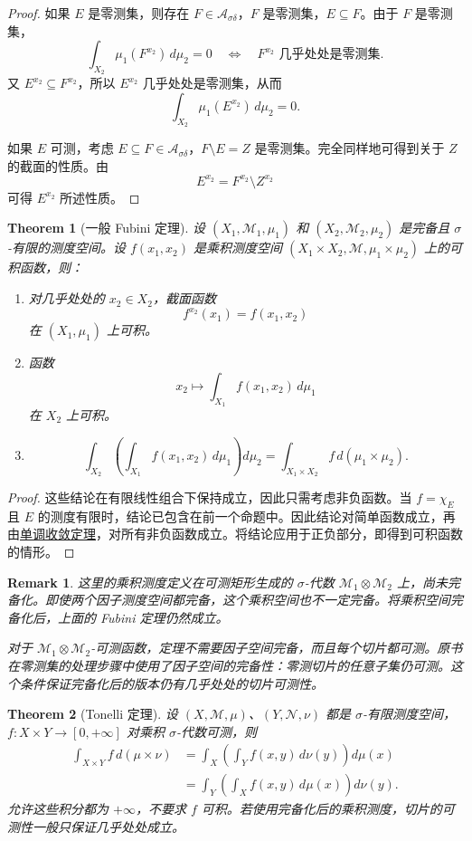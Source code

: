 \documentclass[12pt,letterpaper,twoside,openright]{ctexbook}
\theoremstyle{bluehead}
\newtheorem{theorem}{Theorem}
\theoremstyle{olivehead}
\theoremstyle{orangehead}
\theoremstyle{redremark}
\newtheorem*{remark}{Remark}
\begin{document}
\begin{proof}
如果 $E$ 是零测集，则存在 $F\in\mathcal{A}_{\sigma\delta}$，$F$ 是零测集，$E\subseteq F$。由于 $F$ 是零测集，
\[
  \int_{X_2}\mu_1(F^{x_2})\,d\mu_2=0
  \quad\Longleftrightarrow\quad
  F^{x_2}\text{ 几乎处处是零测集}.
\]
又 $E^{x_2}\subseteq F^{x_2}$，所以 $E^{x_2}$ 几乎处处是零测集，从而
\[
  \int_{X_2}\mu_1(E^{x_2})\,d\mu_2=0.
\]

如果 $E$ 可测，考虑 $E\subseteq F\in\mathcal{A}_{\sigma\delta}$，$F\setminus E=Z$ 是零测集。完全同样地可得到关于 $Z$ 的截面的性质。由
\[
  E^{x_2}=F^{x_2}\setminus Z^{x_2}
\]
可得 $E^{x_2}$ 所述性质。
\end{proof}
\begin{theorem}[一般 Fubini 定理]\label{thm:fubini-general}
设 $(X_1,\mathcal{M}_1,\mu_1)$ 和 $(X_2,\mathcal{M}_2,\mu_2)$ 是完备且 $\sigma$-有限的测度空间。设 $f(x_1,x_2)$ 是乘积测度空间 $(X_1\times X_2,\mathcal{M},\mu_1\times\mu_2)$ 上的可积函数，则：
\begin{enumerate}
  \item[(1)] 对几乎处处的 $x_2\in X_2$，截面函数
  \[
    f^{x_2}(x_1)=f(x_1,x_2)
  \]
  在 $(X_1,\mu_1)$ 上可积。
  \item[(2)] 函数
  \[
    x_2\longmapsto\int_{X_1}f(x_1,x_2)\,d\mu_1
  \]
  在 $X_2$ 上可积。
  \item[(3)]
  \[
    \int_{X_2}\left(\int_{X_1}f(x_1,x_2)\,d\mu_1\right)d\mu_2
    =\int_{X_1\times X_2}f\,d(\mu_1\times\mu_2).
  \]
\end{enumerate}
\end{theorem}
\begin{proof}
这些结论在有限线性组合下保持成立，因此只需考虑非负函数。当 $f=\chi_E$ 且 $E$ 的测度有限时，结论已包含在前一个命题中。因此结论对简单函数成立，再由\hyperref[thm:monotone-convergence]{单调收敛定理}，对所有非负函数成立。将结论应用于正负部分，即得到可积函数的情形。
\end{proof}
\begin{remark}
这里的乘积测度定义在可测矩形生成的 $\sigma$-代数 $\mathcal M_1\otimes\mathcal M_2$ 上，尚未完备化。即使两个因子测度空间都完备，这个乘积空间也不一定完备。将乘积空间完备化后，上面的 Fubini 定理仍然成立。

对于 $\mathcal M_1\otimes\mathcal M_2$-可测函数，定理不需要因子空间完备，而且每个切片都可测。原书在零测集的处理步骤中使用了因子空间的完备性：零测切片的任意子集仍可测。这个条件保证完备化后的版本仍有几乎处处的切片可测性。
\end{remark}
\begin{theorem}[Tonelli 定理]\label{thm:tonelli-general}
设 $(X,\mathcal M,\mu)$、$(Y,\mathcal N,\nu)$ 都是 $\sigma$-有限测度空间，$f:X\times Y\to[0,+\infty]$ 对乘积 $\sigma$-代数可测，则
\[
\begin{aligned}
\int_{X\times Y}f\,d(\mu\times\nu)
&=\int_X\left(\int_Yf(x,y)\,d\nu(y)\right)d\mu(x)\\
&=\int_Y\left(\int_Xf(x,y)\,d\mu(x)\right)d\nu(y).
\end{aligned}
\]
允许这些积分都为 $+\infty$，不要求 $f$ 可积。若使用完备化后的乘积测度，切片的可测性一般只保证几乎处处成立。
\end{theorem}
\end{document}
